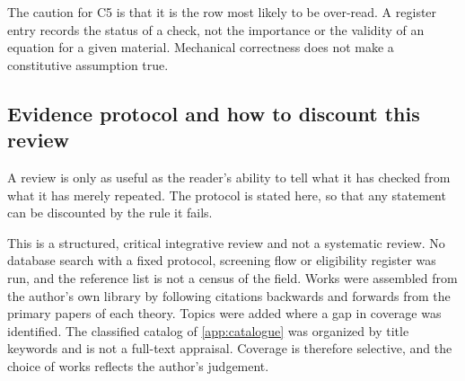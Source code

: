 The caution for C5 is that it is the row most likely to be over-read. A register entry records the status of a check, not the importance or the validity of an equation for a given material. Mechanical correctness does not make a constitutive assumption true.

\subsection{Evidence protocol and how to discount this review}\label{sec:evidence_protocol}

A review is only as useful as the reader's ability to tell what it has checked from what it has merely
repeated. The protocol is stated here, so that any statement can be discounted by the rule it fails.

This is a structured, critical integrative review and not a systematic review. No database search with a fixed protocol, screening flow or eligibility register was run, and the reference list is not a census of the field. Works were assembled from the author's own library by following citations backwards and forwards from the primary papers of each theory. Topics were added where a gap in coverage was identified. The classified catalog of \cref{app:catalogue} was organized by title keywords and is not a full-text appraisal. Coverage is therefore selective, and the choice of works reflects the author's judgement.

